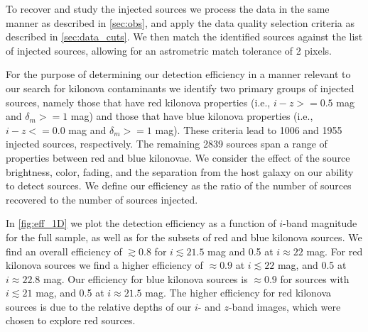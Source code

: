 To recover and study the injected sources we process the data in the same manner as described in \autoref{sec:obs}, and apply the data quality selection criteria as described in \autoref{sec:data_cuts}. We then match the identified sources against the list of injected sources, allowing for an astrometric match tolerance of 2 pixels.

For the purpose of determining our detection efficiency in a manner relevant to our search for kilonova contaminants we identify two primary groups of injected sources, namely those that have red kilonova properties (i.e., $i-z>=0.5$ mag and $\delta_m>=1$ mag) and those that have blue kilonova properties (i.e., $i-z<=0.0$ mag and $\delta_m>=1$ mag). These criteria lead to 1006 and 1955 injected sources, respectively. The remaining 2839 sources span a range of properties between red and blue kilonovae. We consider the effect of the source brightness, color, fading, and the separation from the host galaxy on our ability to detect sources. We define our efficiency as the ratio of the number of sources recovered to the number of sources injected.

In \autoref{fig:eff_1D} we plot the detection efficiency as a function of $i$-band magnitude for the full sample, as well as for the subsets of red and blue kilonova sources. We find an overall efficiency of $\gtrsim0.8$ for $i \lesssim 21.5$ mag and 0.5 at $i \approx 22$ mag. For red kilonova sources we find a higher efficiency of $\approx 0.9$ at $i\lesssim 22$ mag, and 0.5 at $i\approx 22.8$ mag. Our efficiency for blue kilonova sources is $\approx 0.9$ for sources with $i\lesssim 21$ mag, and 0.5 at $i\approx 21.5$ mag. The higher efficiency for red kilonova sources is due to the relative depths of our $i$- and $z$-band images, which were chosen to explore red sources.

